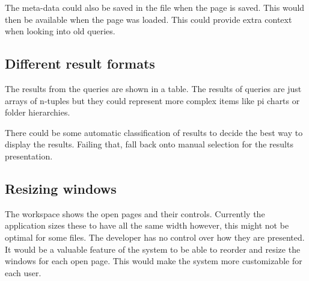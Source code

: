 The meta-data could also be saved in the file when the page is saved.
This would then be available when the page was loaded. This could
provide extra context when looking into old queries.

\subsection{Different result formats}\label{different-result-formats}

The results from the queries are shown in a table. The results of
queries are just arrays of n-tuples but they could represent more
complex items like pi charts or folder hierarchies.

There could be some automatic classification of results to decide the
best way to display the results. Failing that, fall back onto manual
selection for the results presentation.

\subsection{Resizing windows}\label{resizable-windows}

The workspace shows the open pages and their controls. Currently the
application sizes these to have all the same width however, this might
not be optimal for some files. The developer has no control over how
they are presented. It would be a valuable feature of the system to be
able to reorder and resize the windows for each open page. This would
make the system more customizable for each user.
